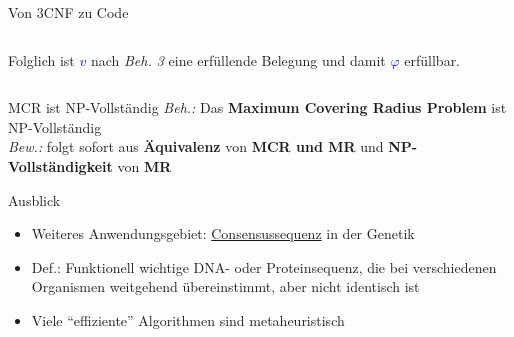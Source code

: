 \documentclass[10pt, aspectratio=169]{beamer}
\begin{document}
\begin{frame}{Von 3CNF zu Code}
\begin{columns}[T]
\begin{column}{0.5\textwidth}
    Folglich ist \textcolor{blue}{$v$} nach \textit{Beh. 3} eine erfüllende Belegung und damit \textcolor{blue}{$\varphi$} erfüllbar.
    \end{column}
    
\end{columns}
\end{frame}
\begin{frame}{MCR ist NP-Vollständig}
\textit{Beh.:} Das \textbf{Maximum Covering Radius Problem} ist NP-Vollständig\\

\textit{Bew.:} folgt sofort aus \alert{\textbf{Äquivalenz}} von \textbf{MCR und MR} und \alert{\textbf{NP-Vollständigkeit}} von \textbf{MR}
\end{frame}
\begin{frame}{Ausblick}
\begin{minipage}[t]{0.5\textwidth}
    \begin{itemize}
    \item Weiteres Anwendungsgebiet: \hyperlink{Ham}{\alert{Consensussequenz}} in der Genetik
    \item Def.: Funktionell wichtige DNA- oder Proteinsequenz, die bei verschiedenen Organismen weitgehend übereinstimmt, aber \alert{nicht} identisch ist 
    \item Viele ``effiziente'' Algorithmen sind metaheuristisch
    
\end{itemize}
\end{minipage}%


\end{frame}
\end{document}
